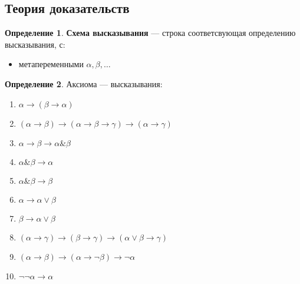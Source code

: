 \documentclass[oneside]{book}
\theoremstyle{plain}
\theoremstyle{remark}
\theoremstyle{definition}
\newtheorem*{definition}{Определение}
\begin{document}
\subsection{Теория доказательств}
\label{sec:org57f52cb}
\begin{definition}
\textbf{Схема высказывания} --- строка соответсвующая определению высказывания, с:
\begin{itemize}
\item метапеременными \(\alpha, \beta, \dots\)
\end{itemize}
\end{definition}
\begin{definition}
Аксиома --- высказывания:
\begin{enumerate}
\item \(\alpha \to (\beta \to \alpha)\)
\item \((\alpha \to \beta) \to (\alpha \to \beta \to \gamma) \to (\alpha \to \gamma)\)
\item \(\alpha \to \beta \to \alpha \& \beta\)
\item \(\alpha \& \beta \to \alpha\)
\item \(\alpha \& \beta \to \beta\)
\item \(\alpha \to \alpha \vee \beta\)
\item \(\beta \to \alpha \vee \beta\)
\item \((\alpha \to \gamma) \to (\beta \to \gamma) \to (\alpha \vee \beta \to \gamma)\)
\item \((\alpha \to \beta) \to (\alpha \to \neg \beta) \to \neg \alpha\)
\item \(\neg\neg \alpha \to \alpha\)
\end{enumerate}
\end{definition}
\end{document}
